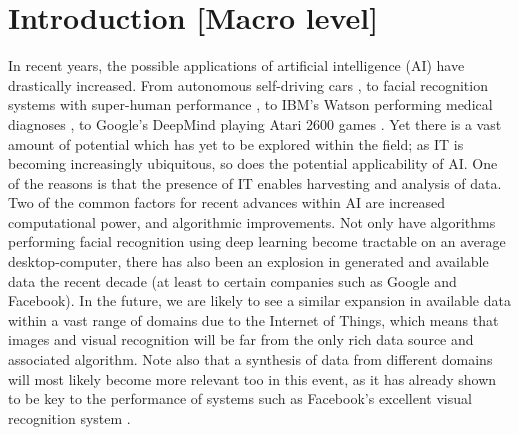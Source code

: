 
\chapter{Introduction [Macro level]}\label{chpt:intro}


In recent years, the possible applications of artificial intelligence (AI) have drastically increased. From autonomous self-driving cars \citep{Urmson2009}, to facial recognition systems with super-human performance \citep{Sun2014}, to IBM's Watson performing medical diagnoses \citep{Wagle2013}, to Google's DeepMind playing Atari 2600 games \citep{Mnih2015}. Yet there is a vast amount of potential which has yet to be explored within the field; as IT is becoming increasingly ubiquitous, so does the potential applicability of AI. One of the reasons is that the presence of IT enables harvesting and analysis of data. Two of the common factors for recent advances within AI are increased computational power, and algorithmic improvements. Not only have algorithms performing facial recognition using deep learning become tractable on an average desktop-computer, there has also been an explosion in generated and available data the recent decade (at least to certain companies such as Google and Facebook). In the future, we are likely to see a similar expansion in available data within a vast range of domains due to the Internet of Things, which means that images and visual recognition will be far from the only rich data source and associated algorithm. Note also that a synthesis of data from different domains will most likely become more relevant too in this event, as it has already shown to be key to the performance of systems such as Facebook's excellent visual recognition system \citep{}.
\\

